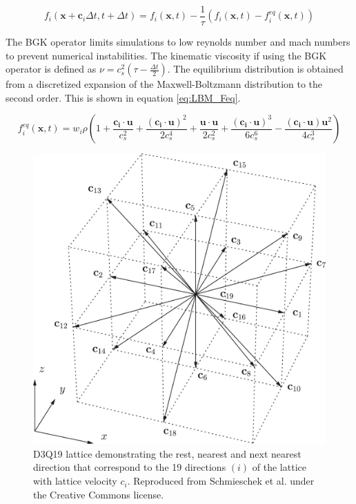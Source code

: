 \begin{equation}
    f_{i}(\mathbf{x} + \mathbf{c}_{i}\Delta t, t + \Delta t) = f_{i}(\mathbf{x}, t) - \frac{1}{\tau}(f_{i}(\mathbf{x}, t) 
    - f_{i}^{eq}(\mathbf{x}, t))
    \label{eq:LBM_BGK}
\end{equation}

The BGK operator limits simulations to low reynolds number and mach numbers to prevent numerical instabilities. 
\cite{qian_lattice_1992} The kinematic viscosity if using the BGK operator is defined as 
$\nu = c_s^2(\tau - \frac{\Delta t}{2})$. The equilibrium distribution is obtained from a discretized expansion of the 
Maxwell-Boltzmann distribution to the second order. \cite{he_theory_1997, succi_lattice_2018} This is shown in equation 
\ref{eq:LBM_Feq}.

\begin{equation}
    f_{i}^{eq}(\mathbf{x}, t) = w_i\rho(1 + \frac{\mathbf{c_i} \cdot \mathbf{u}}{c_s^2} + \frac{(\mathbf{c_i} \cdot 
    \mathbf{u})^2}{2c_s^4} + \frac{\mathbf{u} \cdot \mathbf{u}}{2c_s^2} + \frac{(\mathbf{c_i} \cdot 
    \mathbf{u})^3}{6c_s^6} - \frac{(\mathbf{c_i} \cdot \mathbf{u})\mathbf{u}^2}{4c_s^3})
    \label{eq:LBM_Feq}
\end{equation}

\begin{figure}[h]
    \centering
    \includegraphics[scale = 0.7]{figures/methods/d3q19_lattice.jpg}
    \caption{D3Q19 lattice demonstrating the rest, nearest and next nearest direction that correspond to the 19 
    directions $(i)$ of the lattice with lattice velocity $c_{i}$. \cite{schmieschek_lb3d_2017} Reproduced from 
    Schmieschek et al. under the Creative Commons license.}
    \label{fig:d3q19_lattice}
\end{figure}

